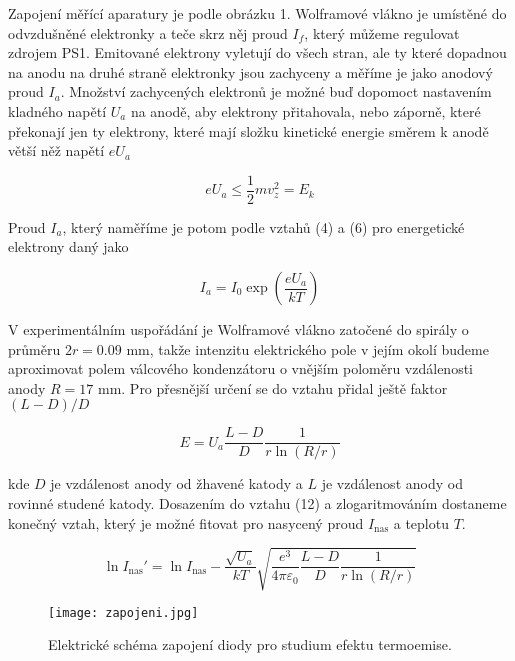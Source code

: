 \documentclass[a4paper,11pt]{article}
\begin{document}
Zapojení měřící aparatury je podle obrázku 1. Wolframové vlákno je umístěné do odvzdušněné elektronky a teče skrz něj proud $ I_f $, který můžeme regulovat zdrojem PS1. Emitované elektrony vyletují do všech stran, ale ty které dopadnou na anodu na druhé straně elektronky jsou zachyceny a měříme je jako anodový proud $ I_a $. Množství zachycených elektronů je možné buď dopomoct nastavením kladného napětí $ U_a $  na anodě, aby elektrony přitahovala, nebo záporně, které překonají jen ty elektrony, které mají složku kinetické energie směrem k anodě větší něž napětí $ e U_a $ 

\begin{equation}
e U_a \le  \frac{1}{2}m v_z^2  = E_k
\end{equation}

\noindent
Proud $ I_a $, který naměříme je potom podle vztahů (4) a (6) pro energetické elektrony daný jako

\begin{equation}
I_a = I_0 \exp \left( {\frac{e U_a}{kT}} \right)
\end{equation}

V experimentálním uspořádání je Wolframové vlákno zatočené do spirály o průměru $  2r = 0.09 $ mm, takže intenzitu elektrického pole v jejím okolí budeme aproximovat polem válcového kondenzátoru o vnějším poloměru vzdálenosti anody $ R = 17 $ mm. Pro přesnější určení se do vztahu přidal ještě faktor $ (L - D) / D $

\begin{equation}
E = U_a \frac{L - D}{D} \frac{1}{r \ln (R / r )}
\end{equation}

\noindent
kde $ D $  je vzdálenost anody od žhavené katody a $ L $  je vzdálenost anody od rovinné studené katody. Dosazením do vztahu (12) a zlogaritmováním dostaneme konečný vztah, který je možné fitovat pro nasycený proud $ I_{\text{nas}} $  a teplotu $ T $.

\begin{equation}
    \ln I_{\text{nas}}' = \ln I_{\text{nas}} -  \frac{ \sqrt{U_a} }{kT} \sqrt{ \frac{e^{3} }{4 \pi \varepsilon_0} \frac{L - D}{D} \frac{1}{r \ln (R / r )} } 
\end{equation}





\begin{figure}[htpb]
    \centering
    \texttt{[image: zapojeni.jpg]}
    \caption{Elektrické schéma zapojení diody pro studium efektu termoemise.}
\end{figure}
\end{document}
